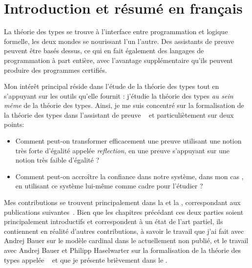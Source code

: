 \chapter{Introduction et résumé en français}



La théorie des types se trouve à l'interface entre programmation et logique
formelle, les deux mondes se nourissant l'un l'autre. Des assistants de preuve
peuvent être basés dessus, ce qui en fait également des langages de
programmation à part entière, avec l'avantage supplémentaire qu'ils peuvent
produire des programmes certifiés.

Mon intérêt principal réside dans l'étude de la théorie des types tout en
s'appuyant sur les outils qu'elle fournit : j'étudie la théorie des types
\emph{au sein même} de la théorie des types.
Ainsi, je me suis concentré sur la formalisation de la théorie des types dans
l'assistant de preuve \Coq~ et particuliètement sur
deux points:
\begin{itemize}
  \item Comment peut-on transformer efficacement une preuve utilisant une notion
  très forte d'égalité appelée \emph{reflection}, en une preuve s'appuyant sur
  une notion très faible d'égalité ?
  \item Comment peut-on accroître la confiance dans notre système, dans mon
  cas \Coq, en utilisant ce système lui-même comme cadre pour l'étudier ?
\end{itemize}

Mes contributions se trouvent principalement dans la 
et la , correspondant aux publications
suivantes~.
Bien que les chapitres précédant ces deux parties soient principalement
introductifs et correspondent à un état de l'art partiel, ils contiennent
en réalité d'autres contributions, à savoir le travail que j'ai fait avec Andrej
Bauer sur le modèle cardinal dans le  actuellement non publié, et
le travail avec Andrej Bauer et Philipp Haselwarter sur la formalisation de la
théorie des types appelée \ftt~ et que je
présente brièvement dans le .

